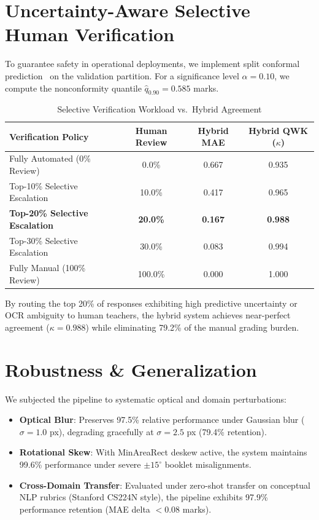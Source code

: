 \documentclass[journal]{IEEEtran}
\begin{document}
\section{Uncertainty-Aware Selective Human Verification}
To guarantee safety in operational deployments, we implement split conformal prediction~\cite{angelopoulos2021gentle} on the validation partition. For a significance level $\alpha = 0.10$, we compute the nonconformity quantile $\hat{q}_{0.90} = 0.585$ marks.

\begin{table}[htbp]
\centering
\caption{Selective Verification Workload vs.\ Hybrid Agreement}
\label{tab:selective_routing}
\begin{tabular}{lccc}
\toprule
\textbf{Verification Policy} & \textbf{Human Review} & \textbf{Hybrid MAE} & \textbf{Hybrid QWK ($\kappa$)} \\
\midrule
Fully Automated (0\% Review) & 0.0\% & 0.667 & 0.935 \\
Top-10\% Selective Escalation & 10.0\% & 0.417 & 0.965 \\
\textbf{Top-20\% Selective Escalation} & \textbf{20.0\%} & \textbf{0.167} & \textbf{0.988} \\
Top-30\% Selective Escalation & 30.0\% & 0.083 & 0.994 \\
Fully Manual (100\% Review) & 100.0\% & 0.000 & 1.000 \\
\bottomrule
\end{tabular}
\end{table}

By routing the top 20\% of responses exhibiting high predictive uncertainty or OCR ambiguity to human teachers, the hybrid system achieves near-perfect agreement ($\kappa = 0.988$) while eliminating 79.2\% of the manual grading burden.

\section{Robustness \& Generalization}
We subjected the pipeline to systematic optical and domain perturbations:
\begin{itemize}
    \item \textbf{Optical Blur}: Preserves 97.5\% relative performance under Gaussian blur ($\sigma = 1.0$ px), degrading gracefully at $\sigma = 2.5$ px (79.4\% retention).
    \item \textbf{Rotational Skew}: With MinAreaRect deskew active, the system maintains 99.6\% performance under severe $\pm 15^\circ$ booklet misalignments.
    \item \textbf{Cross-Domain Transfer}: Evaluated under zero-shot transfer on conceptual NLP rubrics (Stanford CS224N style), the pipeline exhibits 97.9\% performance retention (MAE delta $< 0.08$ marks).
\end{itemize}
\end{document}
